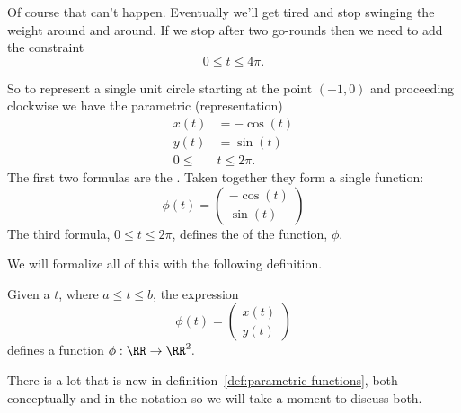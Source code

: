 Of course that can't happen. Eventually we'll get tired and stop
swinging the weight around and around. If we stop after two go-rounds
then we need to add the constraint
$$
0\le t\le 4\pi.
$$

\begin{myexample}
  So to represent a single unit circle starting at the point $(-1,0)$
  and proceeding clockwise we have the parametric 
  (representation)
  \begin{align*}
    x(t) &= -\cos(t)\\
    y(t) &= \sin(t)\\
    0 \le & t \le 2\pi.
  \end{align*}
  The first two formulas are the . Taken
  together they form a single function:
  $$
  \phi(t)=
  \begin{pmatrix}
    -\cos(t)\\
    \sin(t)
  \end{pmatrix}
  $$
  The third formula, $0 \le  t \le 2\pi$, defines the
   of the function, $\phi$.
\end{myexample}
We will formalize all of this with the following  definition.\\
\begin{mydefinition}
  \label{def:parametric-functions}
  Given a  $t$, where $a\le t \le b$, the expression
  $$
  \phi(t) =
  \begin{pmatrix}
    x(t)\\
    y(t)
  \end{pmatrix}
  $$
  defines a function $\phi:\RR\rightarrow \RR^2.$
\end{mydefinition}

There is a lot that is new in
definition~\ref{def:parametric-functions}, both conceptually and 
in the notation so we will take a moment to discuss both.

